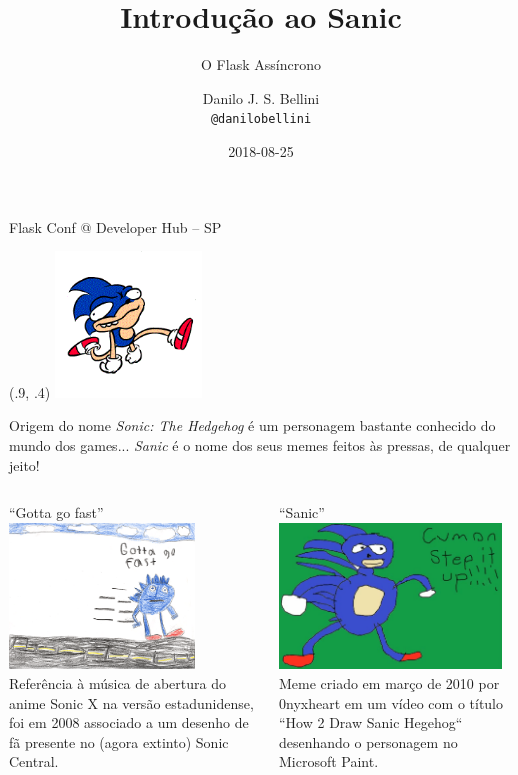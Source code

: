\documentclass[utf8]{beamer}
\title{Introdução ao Sanic}
\subtitle{O Flask Assíncrono}
\author{Danilo J. S. Bellini \\ \texttt{@danilobellini}}
\date{2018-08-25}
\begin{document}
\begin{frame}
  \titlepage
  \center Flask Conf @ Developer Hub -- SP
  \begin{textblock}{0}(.9, .4)%
    \includegraphics[height=110pt]{sanic.png}%
  \end{textblock}
\end{frame}


\begin{frame}{Origem do nome}
  \emph{Sonic: The Hedgehog} é um personagem bastante conhecido
  do mundo dos games...
  \emph{Sanic} é o nome dos seus memes feitos às pressas,
  de qualquer jeito!
  \vfill
  \begin{columns}[t]
    \scriptsize
    ``Gotta go fast''
    \includegraphics[height=110pt]{gotta_go_fast.png}
    Referência à música de abertura
    do anime Sonic X na versão estadunidense,
    foi em 2008 associado a um desenho de fã
    presente no (agora extinto) Sonic Central.

    \scriptsize
    ``Sanic''
    \includegraphics[height=110pt]{sanic_0nyxheart.png}
    Meme criado em março de 2010 por 0nyxheart
    em um vídeo com o título ``How 2 Draw Sanic Hegehog``
    desenhando o personagem no Microsoft Paint.
  \end{columns}
\end{frame}
\end{document}
